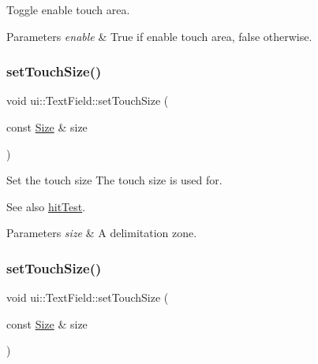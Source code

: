 Toggle enable touch area. 


\begin{DoxyParams}{Parameters}
{\em enable} & True if enable touch area, false otherwise. \\
\hline
\end{DoxyParams}
\mbox{\label{classui_1_1TextField_a3d221174c8a03b9a6c4fc90d1a1b8707}} 
\subsubsection{\texorpdfstring{set\+Touch\+Size()}{setTouchSize()}\hspace{0.1cm}{\footnotesize\ttfamily [1/2]}}
{\footnotesize\ttfamily void ui\+::\+Text\+Field\+::set\+Touch\+Size (\begin{DoxyParamCaption}\item[{const \hyperlink{classSize}{Size} \&}]{size }\end{DoxyParamCaption})}



Set the touch size The touch size is used for. 

\begin{DoxySeeAlso}{See also}
{\ttfamily \hyperlink{classui_1_1TextField_a2ef36bd952e7ef2842ca043662b36669}{hit\+Test}}. 
\end{DoxySeeAlso}

\begin{DoxyParams}{Parameters}
{\em size} & A delimitation zone. \\
\hline
\end{DoxyParams}
\mbox{\label{classui_1_1TextField_a3d221174c8a03b9a6c4fc90d1a1b8707}} 
\subsubsection{\texorpdfstring{set\+Touch\+Size()}{setTouchSize()}\hspace{0.1cm}{\footnotesize\ttfamily [2/2]}}
{\footnotesize\ttfamily void ui\+::\+Text\+Field\+::set\+Touch\+Size (\begin{DoxyParamCaption}\item[{const \hyperlink{classSize}{Size} \&}]{size }\end{DoxyParamCaption})}



